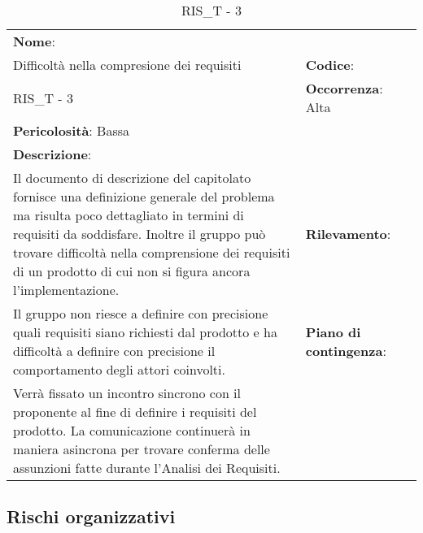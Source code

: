 \renewcommand{\arraystretch}{1.5}
\begin{longtable} { 
		>{\raggedright}p{} 
		>{\raggedright}p{} 
		>{\raggedright}p{}    }
	
	\caption{RIS\_T - 3} \endhead	
	
	
	\textbf{Nome}: \\ Difficoltà nella compresione dei requisiti
	& \textbf{Codice}: \\ RIS\_T - 3  
	& \textbf{Occorrenza}: Alta \\ \textbf{Pericolosità}: Bassa
	
	\tabularnewline
	
	\textbf{Descrizione}: \\ Il documento di descrizione del capitolato fornisce una definizione generale del problema ma risulta poco dettagliato in termini di requisiti da soddisfare. Inoltre il gruppo può trovare difficoltà nella comprensione dei requisiti di un prodotto di cui non si figura ancora l'implementazione.
	& 
	\textbf{Rilevamento}: \\ Il gruppo non riesce a definire con precisione quali requisiti siano richiesti dal prodotto e ha difficoltà a definire con precisione il comportamento degli attori coinvolti.
	
	&  
	\textbf{Piano di contingenza}: \\ Verrà fissato un incontro sincrono con il proponente al fine di definire i requisiti del prodotto. La comunicazione continuerà in maniera asincrona per trovare conferma delle assunzioni fatte durante l'Analisi dei Requisiti.
	
\end{longtable}

\newpage

\subsection{Rischi organizzativi}


